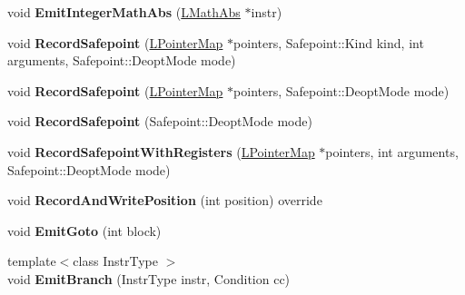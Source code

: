 \begin{DoxyCompactItemize}
\item 
void {\bfseries Emit\+Integer\+Math\+Abs} (\hyperlink{classv8_1_1internal_1_1_l_math_abs}{L\+Math\+Abs} $\ast$instr)\hypertarget{classv8_1_1internal_1_1_l_code_gen_a47f49c0b36ce0adea0f302d6d3e44716}{}\label{classv8_1_1internal_1_1_l_code_gen_a47f49c0b36ce0adea0f302d6d3e44716}

\item 
void {\bfseries Record\+Safepoint} (\hyperlink{classv8_1_1internal_1_1_l_pointer_map}{L\+Pointer\+Map} $\ast$pointers, Safepoint\+::\+Kind kind, int arguments, Safepoint\+::\+Deopt\+Mode mode)\hypertarget{classv8_1_1internal_1_1_l_code_gen_a5c5e6c0360111f74e6c274c456c70b74}{}\label{classv8_1_1internal_1_1_l_code_gen_a5c5e6c0360111f74e6c274c456c70b74}

\item 
void {\bfseries Record\+Safepoint} (\hyperlink{classv8_1_1internal_1_1_l_pointer_map}{L\+Pointer\+Map} $\ast$pointers, Safepoint\+::\+Deopt\+Mode mode)\hypertarget{classv8_1_1internal_1_1_l_code_gen_a7f742e0bc068c384673a3490e15b230c}{}\label{classv8_1_1internal_1_1_l_code_gen_a7f742e0bc068c384673a3490e15b230c}

\item 
void {\bfseries Record\+Safepoint} (Safepoint\+::\+Deopt\+Mode mode)\hypertarget{classv8_1_1internal_1_1_l_code_gen_a3621dccea782082b57057f617a9dd24a}{}\label{classv8_1_1internal_1_1_l_code_gen_a3621dccea782082b57057f617a9dd24a}

\item 
void {\bfseries Record\+Safepoint\+With\+Registers} (\hyperlink{classv8_1_1internal_1_1_l_pointer_map}{L\+Pointer\+Map} $\ast$pointers, int arguments, Safepoint\+::\+Deopt\+Mode mode)\hypertarget{classv8_1_1internal_1_1_l_code_gen_a15c074803ff1d0270234efb3e8830c75}{}\label{classv8_1_1internal_1_1_l_code_gen_a15c074803ff1d0270234efb3e8830c75}

\item 
void {\bfseries Record\+And\+Write\+Position} (int position) override\hypertarget{classv8_1_1internal_1_1_l_code_gen_a7f2c2fb5fe21ed4f96fa43839a3c459d}{}\label{classv8_1_1internal_1_1_l_code_gen_a7f2c2fb5fe21ed4f96fa43839a3c459d}

\item 
void {\bfseries Emit\+Goto} (int block)\hypertarget{classv8_1_1internal_1_1_l_code_gen_a77ef06fc94dce505c88f628d129c114d}{}\label{classv8_1_1internal_1_1_l_code_gen_a77ef06fc94dce505c88f628d129c114d}

\item 
{\footnotesize template$<$class Instr\+Type $>$ }\\void {\bfseries Emit\+Branch} (Instr\+Type instr, Condition cc)\hypertarget{classv8_1_1internal_1_1_l_code_gen_a1f6bfaf873f88f28eced1930c1974403}{}\label{classv8_1_1internal_1_1_l_code_gen_a1f6bfaf873f88f28eced1930c1974403}


\end{DoxyCompactItemize}
